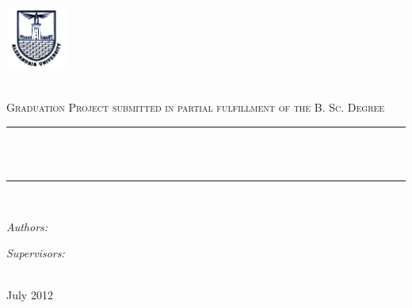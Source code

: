 \documentclass[11pt, a4paper, oneside]{Thesis} %
\title{\ttitle} %
\begin{document}
\frontmatter %


\fancyhead{} %
\rhead{\thepage} %
\lhead{} %

\pagestyle{fancy} %

\newcommand{\HRule}{\rule{\linewidth}{0.5mm}} %


\begin{titlepage}
\begin{center}
\begin{center}
\includegraphics[width=2cm]{Logo_Alexandria_University.jpg} %
\end{center}
\textsc{\LARGE \univname}\\[1.5cm] %
\textsc{\Large Graduation Project submitted in partial fulfillment of the B. Sc. Degree}\\[0.5cm] %

\HRule \\[0.4cm] %
{\huge \bfseries \ttitle}\\[0.4cm] %
\HRule \\[1.5cm] %
 
\begin{minipage}{0.4\textwidth}
\begin{flushleft} \large
\emph{Authors:}\\
{\authornames} %
\end{flushleft}
\end{minipage}
\begin{minipage}{0.45\textwidth}
\begin{flushright} \large
\emph{Supervisors:} \\
{\supname} %
\end{flushright}
\end{minipage}\\[3cm]
  
{\large July 2012}\\[4cm] %

 
\vfill
\end{center}

\end{titlepage}
\end{document}
